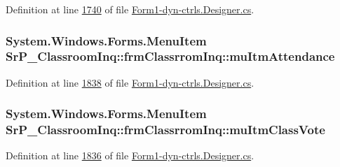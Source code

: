 \-Definition at line \hyperlink{_form1-dyn-ctrls_8_designer_8cs_source_l01740}{1740} of file \hyperlink{_form1-dyn-ctrls_8_designer_8cs_source}{\-Form1-\/dyn-\/ctrls.\-Designer.\-cs}.

\hypertarget{class_sr_p___classroom_inq_1_1frm_classrrom_inq_afdc8efd0fa2025280bc6a44b8d71afc2}{
\subsubsection[{mu\-Itm\-Attendance}]{\setlength{\rightskip}{0pt plus 5cm}\-System.\-Windows.\-Forms.\-Menu\-Item {\bf \-Sr\-P\-\_\-\-Classroom\-Inq\-::frm\-Classrrom\-Inq\-::mu\-Itm\-Attendance}}}
\label{class_sr_p___classroom_inq_1_1frm_classrrom_inq_afdc8efd0fa2025280bc6a44b8d71afc2}


\-Definition at line \hyperlink{_form1-dyn-ctrls_8_designer_8cs_source_l01838}{1838} of file \hyperlink{_form1-dyn-ctrls_8_designer_8cs_source}{\-Form1-\/dyn-\/ctrls.\-Designer.\-cs}.

\hypertarget{class_sr_p___classroom_inq_1_1frm_classrrom_inq_af00bacaa276c0e6c98e046aa01f73696}{
\subsubsection[{mu\-Itm\-Class\-Vote}]{\setlength{\rightskip}{0pt plus 5cm}\-System.\-Windows.\-Forms.\-Menu\-Item {\bf \-Sr\-P\-\_\-\-Classroom\-Inq\-::frm\-Classrrom\-Inq\-::mu\-Itm\-Class\-Vote}}}
\label{class_sr_p___classroom_inq_1_1frm_classrrom_inq_af00bacaa276c0e6c98e046aa01f73696}


\-Definition at line \hyperlink{_form1-dyn-ctrls_8_designer_8cs_source_l01836}{1836} of file \hyperlink{_form1-dyn-ctrls_8_designer_8cs_source}{\-Form1-\/dyn-\/ctrls.\-Designer.\-cs}.


